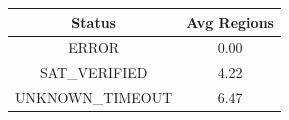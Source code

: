 \begin{tabular}{cc}
\toprule
Status & Avg Regions \\
\midrule
ERROR & 0.00 \\
SAT\_VERIFIED & 4.22 \\
UNKNOWN\_TIMEOUT & 6.47 \\
\bottomrule
\end{tabular}
